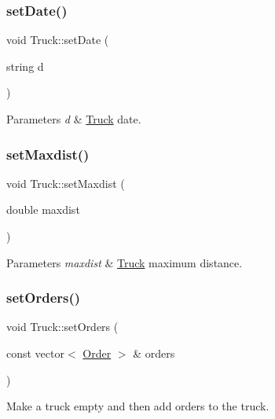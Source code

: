 \subsubsection{\texorpdfstring{set\+Date()}{setDate()}}
{\footnotesize\ttfamily void Truck\+::set\+Date (\begin{DoxyParamCaption}\item[{string}]{d }\end{DoxyParamCaption})}


\begin{DoxyParams}{Parameters}
{\em d} & \hyperlink{class_truck}{Truck} date. \\
\hline
\end{DoxyParams}
\mbox{\label{class_truck_a90bcc83666d4722838bf3ccfc87b4bfd}} 
\subsubsection{\texorpdfstring{set\+Maxdist()}{setMaxdist()}}
{\footnotesize\ttfamily void Truck\+::set\+Maxdist (\begin{DoxyParamCaption}\item[{double}]{maxdist }\end{DoxyParamCaption})}


\begin{DoxyParams}{Parameters}
{\em maxdist} & \hyperlink{class_truck}{Truck} maximum distance. \\
\hline
\end{DoxyParams}
\mbox{\label{class_truck_ac62db578f4c1cc35d889cfde61d695bb}} 
\subsubsection{\texorpdfstring{set\+Orders()}{setOrders()}}
{\footnotesize\ttfamily void Truck\+::set\+Orders (\begin{DoxyParamCaption}\item[{const vector$<$ \hyperlink{class_order}{Order} $>$ \&}]{orders }\end{DoxyParamCaption})}



Make a truck empty and then add orders to the truck. 


